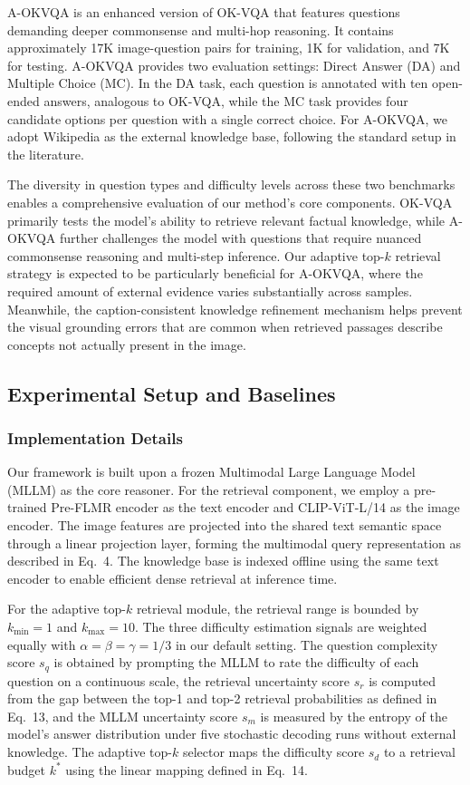 \documentclass[manuscript,screen,review]{acmart}
\begin{document}
A-OKVQA is an enhanced version of OK-VQA that features questions demanding deeper commonsense and multi-hop reasoning. It contains approximately 17K image-question pairs for training, 1K for validation, and 7K for testing. A-OKVQA provides two evaluation settings: Direct Answer (DA) and Multiple Choice (MC). In the DA task, each question is annotated with ten open-ended answers, analogous to OK-VQA, while the MC task provides four candidate options per question with a single correct choice. For A-OKVQA, we adopt Wikipedia as the external knowledge base, following the standard setup in the literature.

The diversity in question types and difficulty levels across these two benchmarks enables a comprehensive evaluation of our method's core components. OK-VQA primarily tests the model's ability to retrieve relevant factual knowledge, while A-OKVQA further challenges the model with questions that require nuanced commonsense reasoning and multi-step inference. Our adaptive top-$k$ retrieval strategy is expected to be particularly beneficial for A-OKVQA, where the required amount of external evidence varies substantially across samples. Meanwhile, the caption-consistent knowledge refinement mechanism helps prevent the visual grounding errors that are common when retrieved passages describe concepts not actually present in the image.

\subsection{Experimental Setup and Baselines}

\subsubsection{Implementation Details}

Our framework is built upon a frozen Multimodal Large Language Model (MLLM) as the core reasoner. For the retrieval component, we employ a pre-trained Pre-FLMR encoder as the text encoder and CLIP-ViT-L/14 as the image encoder. The image features are projected into the shared text semantic space through a linear projection layer, forming the multimodal query representation as described in Eq.~4. The knowledge base is indexed offline using the same text encoder to enable efficient dense retrieval at inference time.

For the adaptive top-$k$ retrieval module, the retrieval range is bounded by $k_{\min}=1$ and $k_{\max}=10$. The three difficulty estimation signals are weighted equally with $\alpha=\beta=\gamma=1/3$ in our default setting. The question complexity score $s_q$ is obtained by prompting the MLLM to rate the difficulty of each question on a continuous scale, the retrieval uncertainty score $s_r$ is computed from the gap between the top-1 and top-2 retrieval probabilities as defined in Eq.~13, and the MLLM uncertainty score $s_m$ is measured by the entropy of the model's answer distribution under five stochastic decoding runs without external knowledge. The adaptive top-$k$ selector maps the difficulty score $s_d$ to a retrieval budget $k^{*}$ using the linear mapping defined in Eq.~14.
\end{document}
